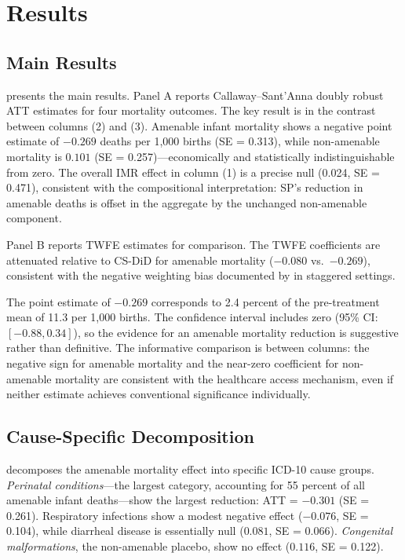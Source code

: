 \documentclass[12pt]{article}
\begin{document}
\section{Results}

\subsection{Main Results}

 presents the main results. Panel A reports Callaway--Sant'Anna doubly robust ATT estimates for four mortality outcomes. The key result is in the contrast between columns (2) and (3). Amenable infant mortality shows a negative point estimate of $-0.269$ deaths per 1,000 births (SE = 0.313), while non-amenable mortality is $0.101$ (SE = 0.257)---economically and statistically indistinguishable from zero. The overall IMR effect in column (1) is a precise null (0.024, SE = 0.471), consistent with the compositional interpretation: SP's reduction in amenable deaths is offset in the aggregate by the unchanged non-amenable component.

Panel B reports TWFE estimates for comparison. The TWFE coefficients are attenuated relative to CS-DiD for amenable mortality ($-0.080$ vs.\ $-0.269$), consistent with the negative weighting bias documented by \citet{goodmanbacon2021} in staggered settings.



The point estimate of $-0.269$ corresponds to 2.4 percent of the pre-treatment mean of 11.3 per 1,000 births. The confidence interval includes zero (95\% CI: $[-0.88, 0.34]$), so the evidence for an amenable mortality reduction is suggestive rather than definitive. The informative comparison is between columns: the negative sign for amenable mortality and the near-zero coefficient for non-amenable mortality are consistent with the healthcare access mechanism, even if neither estimate achieves conventional significance individually.

\subsection{Cause-Specific Decomposition}

 decomposes the amenable mortality effect into specific ICD-10 cause groups. \textit{Perinatal conditions}---the largest category, accounting for 55 percent of all amenable infant deaths---show the largest reduction: ATT = $-0.301$ (SE = 0.261). Respiratory infections show a modest negative effect ($-0.076$, SE = 0.104), while diarrheal disease is essentially null ($0.081$, SE = 0.066). \textit{Congenital malformations}, the non-amenable placebo, show no effect ($0.116$, SE = 0.122).
\end{document}
